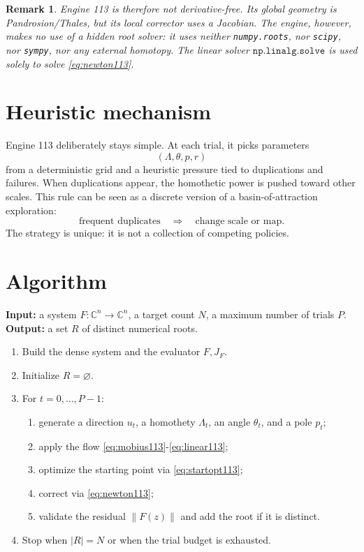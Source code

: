 \documentclass[11pt,a4paper]{article}
\newtheorem{remark}{Remark}
\begin{document}
\begin{remark}
Engine 113 is therefore not derivative-free. Its global geometry is Pandrosion/Thales, but its local corrector uses a Jacobian. The engine, however, makes no use of a hidden root solver: it uses neither \texttt{numpy.roots}, nor \texttt{scipy}, nor \texttt{sympy}, nor any external homotopy. The linear solver \(\texttt{np.linalg.solve}\) is used solely to solve \eqref{eq:newton113}.
\end{remark}

\section{Heuristic mechanism}
Engine 113 deliberately stays simple. At each trial, it picks parameters
\[
  (\Lambda,\theta,p,r)
\]
from a deterministic grid and a heuristic pressure tied to duplications and failures. When duplications appear, the homothetic power is pushed toward other scales. This rule can be seen as a discrete version of a basin-of-attraction exploration:
\[
  \text{frequent duplicates} \quad\Rightarrow\quad \text{change scale or map}.
\]
The strategy is unique: it is not a collection of competing policies.

\section{Algorithm}
\noindent\textbf{Input:} a system \(F:\mathbb C^n\to\mathbb C^n\), a target count \(N\), a maximum number of trials \(P\).\\
\textbf{Output:} a set \(R\) of distinct numerical roots.
\begin{enumerate}
  \item Build the dense system and the evaluator \(F,J_F\).
  \item Initialize \(R=\varnothing\).
  \item For \(t=0,\ldots,P-1\):
  \begin{enumerate}
    \item generate a direction \(u_t\), a homothety \(\Lambda_t\), an angle \(\theta_t\), and a pole \(p_t\);
    \item apply the flow \eqref{eq:mobius113}-\eqref{eq:linear113};
    \item optimize the starting point via \eqref{eq:startopt113};
    \item correct via \eqref{eq:newton113};
    \item validate the residual \(\|F(z)\|\) and add the root if it is distinct.
  \end{enumerate}
  \item Stop when \(|R|=N\) or when the trial budget is exhausted.
\end{enumerate}
\end{document}
